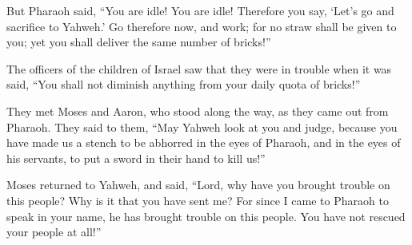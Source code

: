 {\par }{\PP {}But Pharaoh said, “You are idle! You are idle! Therefore you say, ‘Let’s go and sacrifice to Yahweh.’
Go therefore now, and work; for no straw shall be given to you; yet you shall deliver the same number of bricks!”
\par }{\PP {}The officers of the children of Israel saw that they were in trouble when it was said, “You shall not diminish anything from your daily quota of bricks!”
\par }{\PP {}They met Moses and Aaron, who stood along the way, as they came out from Pharaoh.
They said to them, “May Yahweh look at you and judge, because you have made us a stench to be abhorred in the eyes of Pharaoh, and in the eyes of his servants, to put a sword in their hand to kill us!”
\par }{\PP {}Moses returned to Yahweh, and said, “Lord, why have you brought trouble on this people? Why is it that you have sent me?
For since I came to Pharaoh to speak in your name, he has brought trouble on this people. You have not rescued your people at all!”

}

